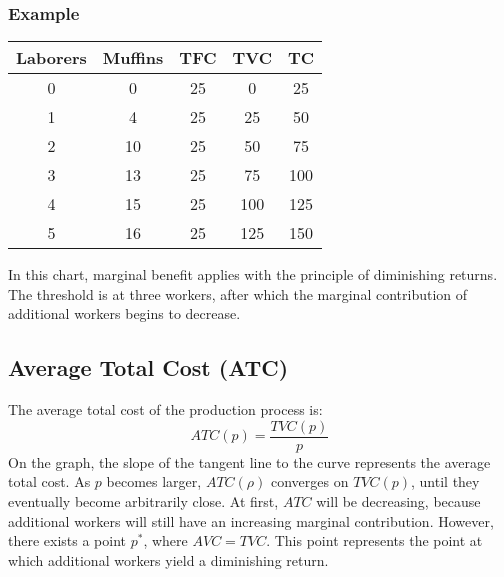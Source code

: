 \documentclass[letterpaper, 12pt]{article}
\begin{document}
\subsubsection{Example}
\begin{center}
  \begin{tabular}{|c|c|c|c|c|}
    \hline
    Laborers & Muffins & TFC & TVC  & TC  \\ \hline
    0        & 0       & 25  & 0    & 25  \\ \hline
    1        & 4       & 25  & 25   & 50  \\ \hline
    2        & 10      & 25  & 50   & 75  \\ \hline
    3        & 13      & 25  & 75   & 100 \\ \hline
    4        & 15      & 25  & 100  & 125 \\ \hline
    5        & 16      & 25  & 125  & 150 \\ \hline
  \end{tabular}
\end{center}
In this chart, marginal benefit applies with the principle of diminishing
returns. The threshold is at three workers, after which the marginal
contribution of additional workers begins to decrease.
\begin{center}
\end{center}

\subsection{Average Total Cost (ATC)}
The average total cost of the production process is:
\[ ATC(p) = \frac{TVC(p)}{p} \]
On the graph, the slope of the tangent line to the curve represents the
average total cost. As \( p \) becomes larger, \( ATC(ρ) \) converges on
\( TVC(p) \), until they eventually become arbitrarily close. At first,
\( ATC \) will be decreasing, because additional workers will still have an
increasing marginal contribution. However, there exists a point \( p^{*} \),
where \( AVC = TVC \). This point represents the point at which additional
workers yield a diminishing return.
\end{document}
